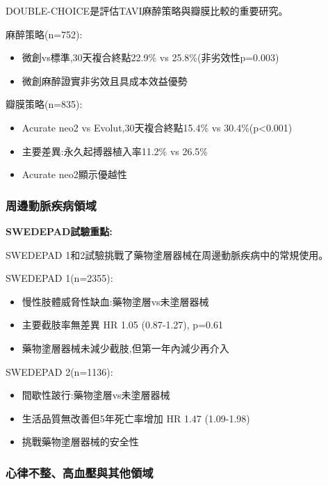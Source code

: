 \documentclass[12pt,a4paper]{article}
\begin{document}
DOUBLE-CHOICE是評估TAVI麻醉策略與瓣膜比較的重要研究。

麻醉策略(n=752):
\begin{itemize}[nosep]
    \item 微創vs標準,30天複合終點22.9\% vs 25.8\%(非劣效性p=0.003)
    \item 微創麻醉證實非劣效且具成本效益優勢
\end{itemize}

瓣膜策略(n=835):
\begin{itemize}[nosep]
    \item Acurate neo2 vs Evolut,30天複合終點15.4\% vs 30.4\%(p<0.001)
    \item 主要差異:永久起搏器植入率11.2\% vs 26.5\%
    \item Acurate neo2顯示優越性
\end{itemize}

\subsubsection{周邊動脈疾病領域}

\textbf{SWEDEPAD試驗重點:}

SWEDEPAD 1和2試驗挑戰了藥物塗層器械在周邊動脈疾病中的常規使用。

SWEDEPAD 1(n=2355):
\begin{itemize}[nosep]
    \item 慢性肢體威脅性缺血:藥物塗層vs未塗層器械
    \item 主要截肢率無差異 HR 1.05 (0.87-1.27), p=0.61
    \item 藥物塗層器械未減少截肢,但第一年內減少再介入
\end{itemize}

SWEDEPAD 2(n=1136):
\begin{itemize}[nosep]
    \item 間歇性跛行:藥物塗層vs未塗層器械
    \item 生活品質無改善但5年死亡率增加 HR 1.47 (1.09-1.98)
    \item 挑戰藥物塗層器械的安全性
\end{itemize}

\subsubsection{心律不整、高血壓與其他領域}
\end{document}
